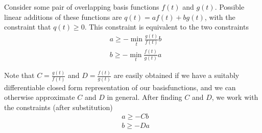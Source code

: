 \documentclass{amsart}
\begin{document}
  Consider some pair of overlapping basis functions $f(t)$ and $g(t)$. Possible linear additions of these functions are $q(t) = a f(t) + b g(t)$, with the constraint that $q(t) \geq 0$. This constraint is equivalent to the two constraints
  \begin{align*}
    & a \geq -\min_t \frac{g(t)}{f(t)} b \\
    & b \geq -\min_t \frac{f(t)}{g(t)} a
  \end{align*}

  Note that $C = \frac{g(t)}{f(t)}$ and $D = \frac{f(t)}{g(t)}$ are easily obtained if we have a suitably differentiable closed form representation of our basisfunctions, and we can otherwise approximate $C$ and $D$ in general. After finding $C$ and $D$, we work with the constraints (after substitution)
  \begin{align*}
    & a \geq -C b \\
    & b \geq -D a
  \end{align*}
\end{document}
